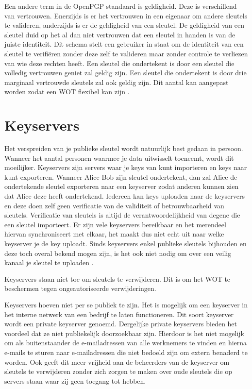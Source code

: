 Een andere term in de OpenPGP standaard is geldigheid. Deze is verschillend van
vertrouwen. Enerzijds is er het vertrouwen in een eigenaar om andere sleutels te
valideren, anderzijds is er de geldigheid van een sleutel. De geldigheid van een
sleutel duid op het al dan niet vertrouwen dat een sleutel in handen is van de
juiste identiteit.
Dit schema stelt een gebruiker in staat om de identiteit van een sleutel te
verifiëren zonder deze zelf te valideren maar zonder controle te verliezen van
wie deze rechten heeft. Een sleutel die ondertekent is door een sleutel die
volledig vertrouwen geniet zal geldig zijn. Een sleutel die ondertekent is door
drie marginaal vertrouwde sleutels zal ook geldig zijn. Dit aantal kan aangepast
worden zodat een WOT flexibel kan zijn \autocite{GNUManualValidatingKeys}.

\section{Keyservers}
\label{sec:keyservers}

Het verspreiden van je publieke sleutel wordt natuurlijk best gedaan in persoon.
Wanneer het aantal personen waarmee je data uitwisselt toeneemt, wordt dit
moeilijker. Keyservers zijn servers waar je keys van kunt importeren en keys
naar kunt exporteren. Wanneer Alice Bob zijn sleutel ondertekent, dan zal Alice
de ondertekende sleutel exporteren naar een keyserver zodat anderen kunnen zien
dat Alice deze heeft ondertekend. Iedereen kan keys uploaden naar de keyservers
en deze doen zelf geen verificatie van de validiteit of betrouwbaarheid van
sleutels. Verificatie van sleutels is altijd de verantwoordelijkheid van degene
die een sleutel importeert. Er zijn vele keyservers bereikbaar en het merendeel
hiervan synchroniseert met elkaar, het maakt dus niet echt uit naar welke
keyserver je de key uploadt. Sinds keyservers enkel publieke sleutels bijhouden
en deze toch overal bekend mogen zijn, is het ook niet nodig om over een veilig
kanaal je sleutel te uploaden \autocite{GNUManualDistributingKeys}.

Keyservers staan niet toe om sleutels te verwijderen. Dit is om het WOT te
beschermen tegen ongeautoriseerde verwijderingen.

Keyservers hoeven niet per se publiek te zijn. Het is mogelijk om een keyserver
in het interne netwerk van een bedrijf te laten functioneren. Dit soort
keyserver wordt een private keyserver genoemd. Dergelijke private keyservers
bieden het voordeel dat ze niet publiekelijk doorzoekbaar zijn. Hierdoor is het
niet mogelijk om als buitenstaander de e-mailadressen van alle werknemers te
vinden en hierna e-mails te sturen naar e-mailadressen die niet bedoeld zijn om
extern benaderd te worden. Ook geeft dit meer vrijheid aan de beheerders van de
keyserver om sleutels te verwijderen zonder zich zorgen te maken over oude
sleutels die op servers staan waar zij geen toegang tot hebben.

